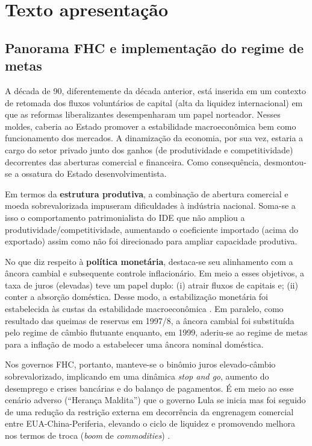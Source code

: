 \documentclass[11pt]{article}
\begin{document}
\section*{Texto apresentação}
\label{sec:org711526d}

\subsection*{Panorama FHC e implementação do regime de metas}
\label{sec:org8bffe35}

A década de 90, diferentemente da década anterior, está inserida em um contexto de retomada dos fluxos voluntários de capital (alta da liquidez internacional) em que as reformas liberalizantes desempenharam um papel norteador.
Nesses moldes, caberia ao Estado promover a estabilidade macroeconômica bem como funcionamento dos mercados.
A dinamização da economia, por sua vez, estaria a cargo do setor privado junto dos ganhos (de produtividade e competitividade) decorrentes das aberturas comercial e financeira.
Como consequência, desmontou-se a ossatura do Estado desenvolvimentista.

Em termos da \textbf{estrutura produtiva}, a combinação de abertura comercial e moeda sobrevalorizada impuseram dificuldades à indústria nacional. 
Soma-se a isso o comportamento patrimonialista do IDE que não ampliou a produtividade/competitividade, aumentando o coeficiente importado (acima do exportado) assim como não foi direcionado para ampliar capacidade produtiva. 

No que diz respeito à \textbf{política monetária}, destaca-se seu alinhamento com a âncora cambial e subsequente controle inflacionário. 
Em meio a esses objetivos, a taxa de juros (elevadas) teve um papel duplo:
(i) atrair fluxos de capitais e;
(ii) conter a absorção doméstica.
Desse modo, a estabilização monetária foi estabelecida às custas da estabilidade macroeconômica \cite{belluzzoDepoisQuedaEconomia2002}.
Em paralelo, como resultado das queimas de reservas em 1997/8, a âncora cambial foi substituída pelo regime de câmbio flutuante enquanto, em 1999, aderiu-se ao regime de metas para a inflação de modo a estabelecer uma âncora nominal doméstica.

Nos governos FHC, portanto, manteve-se o binômio juros elevado-câmbio sobrevalorizado, implicando em uma dinâmica \emph{stop and go}, aumento do desemprego e crises bancárias e do balanço de pagamentos.
É em meio ao esse cenário adverso (``Herança Maldita'') que o governo Lula se inicia mas foi seguido de uma redução da restrição externa em decorrência da engrenagem comercial entre EUA-China-Periferia, elevando o ciclo de liquidez e promovendo melhora nos termos de troca (\emph{boom} de \emph{commodities}) \cite{carneiroDesenvolvimentoEmCrise2002}. 
\end{document}
